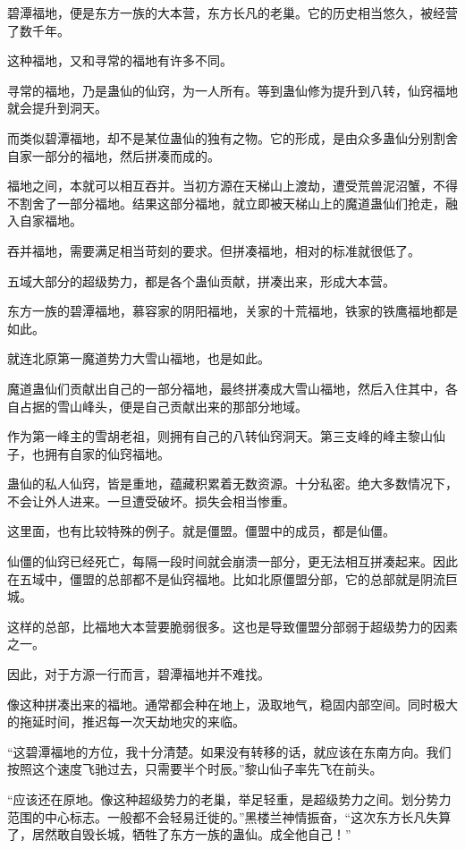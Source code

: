 
\begin{this_body}

碧潭福地，便是东方一族的大本营，东方长凡的老巢。它的历史相当悠久，被经营了数千年。

这种福地，又和寻常的福地有许多不同。

寻常的福地，乃是蛊仙的仙窍，为一人所有。等到蛊仙修为提升到八转，仙窍福地就会提升到洞天。

而类似碧潭福地，却不是某位蛊仙的独有之物。它的形成，是由众多蛊仙分别割舍自家一部分的福地，然后拼凑而成的。

福地之间，本就可以相互吞并。当初方源在天梯山上渡劫，遭受荒兽泥沼蟹，不得不割舍了一部分福地。结果这部分福地，就立即被天梯山上的魔道蛊仙们抢走，融入自家福地。

吞并福地，需要满足相当苛刻的要求。但拼凑福地，相对的标准就很低了。

五域大部分的超级势力，都是各个蛊仙贡献，拼凑出来，形成大本营。

东方一族的碧潭福地，慕容家的阴阳福地，关家的十荒福地，铁家的铁鹰福地都是如此。

就连北原第一魔道势力大雪山福地，也是如此。

魔道蛊仙们贡献出自己的一部分福地，最终拼凑成大雪山福地，然后入住其中，各自占据的雪山峰头，便是自己贡献出来的那部分地域。

作为第一峰主的雪胡老祖，则拥有自己的八转仙窍洞天。第三支峰的峰主黎山仙子，也拥有自家的仙窍福地。

蛊仙的私人仙窍，皆是重地，蕴藏积累着无数资源。十分私密。绝大多数情况下，不会让外人进来。一旦遭受破坏。损失会相当惨重。

这里面，也有比较特殊的例子。就是僵盟。僵盟中的成员，都是仙僵。

仙僵的仙窍已经死亡，每隔一段时间就会崩溃一部分，更无法相互拼凑起来。因此在五域中，僵盟的总部都不是仙窍福地。比如北原僵盟分部，它的总部就是阴流巨城。

这样的总部，比福地大本营要脆弱很多。这也是导致僵盟分部弱于超级势力的因素之一。

因此，对于方源一行而言，碧潭福地并不难找。

像这种拼凑出来的福地。通常都会种在地上，汲取地气，稳固内部空间。同时极大的拖延时间，推迟每一次天劫地灾的来临。

“这碧潭福地的方位，我十分清楚。如果没有转移的话，就应该在东南方向。我们按照这个速度飞驰过去，只需要半个时辰。”黎山仙子率先飞在前头。

“应该还在原地。像这种超级势力的老巢，举足轻重，是超级势力之间。划分势力范围的中心标志。一般都不会轻易迁徙的。”黑楼兰神情振奋，“这次东方长凡失算了，居然敢自毁长城，牺牲了东方一族的蛊仙。成全他自己！”


\end{this_body}
